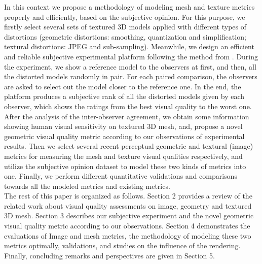 In this context we propose a methodology of modeling mesh and texture metrics properly and efficiently, based on the subjective opinion. For this purpose, we firstly select several sets of textured 3D models applied with different types of distortions (geometric distortions: smoothing, quantization and simplification; textural distortions: JPEG and sub-sampling). Meanwhile, we design an efficient and reliable subjective experimental platform following the method from \cite{Farrell_2001}. During the experiment, we show a reference model to the observers at first, and then, all the distorted models randomly in pair. For each paired comparison, the observers are asked to select out the model closer to the reference one. In the end, the platform produces a subjective rank of all the distorted models given by each observer, which shows the ratings from the best visual quality to the worst one. After the analysis of the inter-observer agreement, we obtain some information showing human visual sensitivity on textured 3D mesh, and, propose a novel geometric visual quality metric according to our observations of experimental results. Then we select several recent perceptual geometric and textural (image) metrics for measuring the mesh and texture visual qualities respectively, and utilize the subjective opinion dataset to model these two kinds of metrics into one. Finally, we perform different quantitative validations and comparisons towards all the modeled metrics and existing metrics.\\
The rest of this paper is organized as follows. Section 2 provides a review of the related work about visual quality assessments on image, geometry and textured 3D mesh.  Section 3 describes our subjective experiment and the novel geometric visual quality metric according to our observations.
Section 4 demonstrates the evaluations of Image and mesh metrics, the methodology of  modeling these two  metrics optimally, validations, and studies on the influence of the rendering. Finally, concluding remarks and perspectives are given in Section 5.